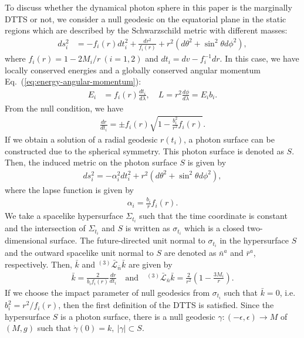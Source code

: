 \documentclass[prd,showpacs,preprintnumbers,groupedaddress,superscriptaddress,nofootinbib,11pt]{revtex4-1} %
\theoremstyle{newplain}
\begin{document}
To discuss whether the dynamical photon sphere in this paper is the marginally DTTS or not, we consider a null geodesic on the equatorial plane in the static regions 
which are described by the Schwarzschild  metric with different masses:
\begin{align}
  ds^{2}_{i}&= -f_{i}(r) d t_i^{2}+\frac{d r^{2}}{f_{i} (r)}+r^{2}(d \theta^{2}+\sin ^{2} \theta d \phi^{2}),
\end{align}
where $f_i(r) = 1-2M_i/r~ (i=1,2)$ and $dt_i = dv - f_i^{-1}dr$.
In this case, we have locally conserved energies and a globally conserved angular momentum Eq.~(\ref{eq:energy-angular-momentum}):
\begin{align}
  E_i &= f_{i}(r) \frac{dt_i}{d\lambda},
  \quad
  L = r^{2} \frac{d\phi}{d\lambda} = E_{i} b_{i}.
\end{align}
From the null condition, we have
\begin{align}
  \frac{d r}{d t_i}=\pm f_{i}(r) \sqrt{1-\frac{b_{i}^{2}}{r^{2}} f_{i}(r)}.
\end{align}
If we obtain a solution of a radial geodesic $r(t_i)$, a photon surface can be constructed due to the spherical symmetry. This photon surface is denoted as $S$.
Then, the induced metric on the photon surface $S$ is given by
\begin{align}
  d s^{2}_{i}=-\alpha_{i}^{2} d t_i^{2}+r^{2}(d \theta^{2}+\sin ^{2} \theta d \phi^{2}),
\end{align}
where the lapse function is given by
\begin{align}
  \alpha_{i}=\frac{b_{i}}{r} f_{i}(r).
\end{align}
We take a spacelike hypersurface $\Sigma_{t_i}$ such that the time coordinate is constant and
the intersection of $\Sigma_{t_i}$ and $S$ is written as $\sigma_{t_i}$ which is a closed two-dimensional surface.
The future-directed unit normal to $\sigma_{t_i}$ in the hypersurface $S$ and the outward spacelike unit normal to $S$ are denoted as $\bar{n}^a$ and $\bar{r}^a$, respectively.
Then, $\bar{k}$ and $ ^{(3)}\bar{\mathcal{L}}_{\bar{n}} \bar{k}$ are given by
\begin{align}
  \bar{k}=\frac{2}{b_{i} f_{i}(r)} \frac{d r}{d t_i}
  \quad
  \text{and}
  \quad
  ^{(3)}\bar{\mathcal{L}}_{\bar{n}} \bar{k}
  =\frac{2}{r^{2}}\left(1-\frac{3 M_{i}}{r}\right).
\end{align}
If we choose the impact parameter of null geodesics from $\sigma_{t_i}$ such that $\bar{k}=0$, i.e. $b_i^2=r^2/f_i(r)$, 
then the first definition of the DTTS is satisfied.
Since the hypersurface $S$ is a photon surface, there is a null geodesic $\gamma\colon (-\epsilon,\epsilon) \to M$ of $(M, {g})$ such that $\dot{\gamma}(0) ={k},~|\gamma|\subset S$. 
\end{document}
